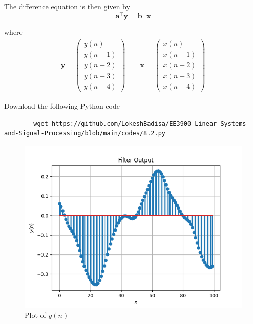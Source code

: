 \documentclass[journal,12pt,twocolumn]{IEEEtran}
\let\vec\mathbf
\numberwithin{equation}{section}
\renewcommand\thesection{\arabic{section}}
\newcommand{\myvec}[1]{\ensuremath{\begin{pmatrix}#1\end{pmatrix}}}
\begin{document}
\begin{enumerate}[label=\thesection.\arabic*]
	The difference equation is then given by
	\begin{equation}
		\vec{a}^\top \vec{y} = \vec{b}^\top \vec{x} 
	\end{equation}
	
	where
	\begin{align}
		\vec{y} = \myvec{y(n) \\ y(n-1) \\ y(n-2) \\ y(n-3) \\ y(n-4)} \qquad
		\vec{x} = \myvec{x(n) \\ x(n-1) \\ x(n-2) \\ x(n-3) \\ x(n-4)}
	\end{align}
	
	Download the following Python code
	\begin{lstlisting}
		wget https://github.com/LokeshBadisa/EE3900-Linear-Systems-and-Signal-Processing/blob/main/codes/8.2.py
	\end{lstlisting}
	
	\begin{figure}[!ht]
		\centering
		\includegraphics[width=\columnwidth]{./figs/7.2.1.png}
		\caption{Plot of $y(n)$}
		\label{fig-7.2.1}	
	\end{figure}
	

\end{enumerate}
\end{document}
